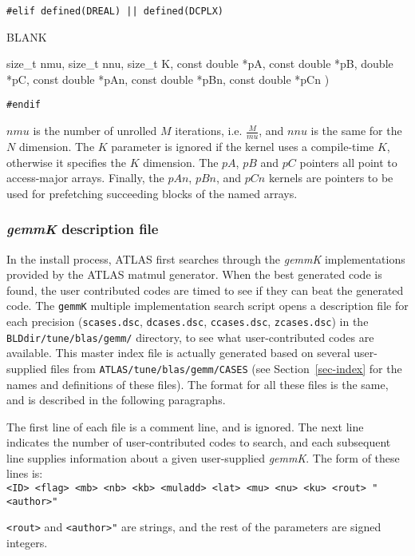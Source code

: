 \documentclass[11pt]{article}
\newenvironment{routdef}[1]
{
   \begin{list}{BLANK}
   {
      \setlength{\parsep}{0in}
      \setlength{\itemsep}{.01in}
      \setlength{\partopsep}{0in}
      \setlength{\topsep}{0.1in}
      \setlength{\labelsep}{0in}
      \setlength{\labelwidth}{#1in}
      \setlength{\leftmargin}{#1in}
   }
} {\end{list}}
\newcommand{\rditem}[2]{\item[#1\hfill(~]#2 )}
\begin{document}
\noindent
\verb+#elif defined(DREAL) || defined(DCPLX)+
\begin{routdef}{1.8}
\rditem{~~~void ATL\_USERMM}
{size_t nmu, size_t nnu, size_t K, const double *pA, const double *pB, 
 double *pC, const double *pAn, const double *pBn, const double *pCn}
\end{routdef}

\noindent
\verb+#endif+

$nmu$ is the number of unrolled $M$ iterations, i.e. $\frac{M}{mu}$, and
$nnu$ is the same for the $N$ dimension.  The $K$ parameter is ignored if
the kernel uses a compile-time $K$, otherwise it specifies the $K$ dimension.
The $pA$, $pB$ and $pC$ pointers all point to access-major arrays.
Finally, the $pAn$, $pBn$, and $pCn$ kernels are pointers to be used for
prefetching succeeding blocks of the named arrays.

\subsubsection{{\it gemmK} description file}
In the install process, ATLAS first searches through the {\it gemmK}
implementations provided by the ATLAS matmul generator.  When the
best generated code is found, the user contributed codes are timed
to see if they can beat the generated code.  The {\tt gemmK} multiple
implementation search
script opens a description file for each precision 
({\tt scases.dsc}, {\tt dcases.dsc}, {\tt ccases.dsc}, {\tt zcases.dsc})
in the {\tt BLDdir/tune/blas/gemm/} directory,
to see what user-contributed codes are available.  This master index
file is actually generated based on several user-supplied files from
{\tt ATLAS/tune/blas/gemm/CASES} (see Section~\ref{sec-index} for the
names and definitions of these files).  The format for all these files
is the same, and is described in the following paragraphs.

The first line of each file is a comment line, and is ignored.  The next
line indicates the number of user-contributed codes to search, and
each subsequent line supplies information about a given user-supplied
{\it gemmK}.  The form of these lines is:\\
\verb+<ID> <flag> <mb> <nb> <kb> <muladd> <lat> <mu> <nu> <ku> <rout> "<author>"+

\verb+<rout>+ and \verb+<author>"+ are strings, and the rest of the
parameters are signed integers.  
\end{document}
